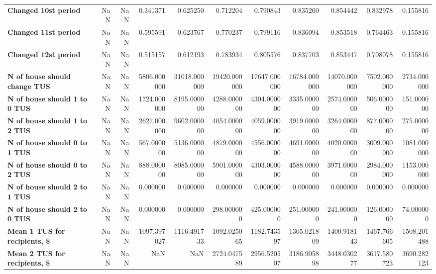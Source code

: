 \begin{longtable}{lrrrrrrrrrr}
\textbf{Changed 10st period               } &   NaN &   NaN &     0.341371 &      0.625250 &      0.712204 &      0.790843 &      0.835260 &      0.854442 &     0.832978 &     0.155816 \\
\textbf{Changed 11st period               } &   NaN &   NaN &     0.595591 &      0.623767 &      0.770237 &      0.799116 &      0.836094 &      0.853518 &     0.764463 &     0.155816 \\
\textbf{Changed 12st period               } &   NaN &   NaN &     0.515157 &      0.612193 &      0.783934 &      0.805576 &      0.837703 &      0.853447 &     0.708078 &     0.155816 \\
\textbf{N of house should change TUS      } &   NaN &   NaN &  5806.000000 &  31018.000000 &  19420.000000 &  17647.000000 &  16784.000000 &  14070.000000 &  7502.000000 &  2734.000000 \\
\textbf{N of house should 1 to 0 TUS      } &   NaN &   NaN &  1724.000000 &   8195.000000 &   4288.000000 &   4304.000000 &   3335.000000 &   2574.000000 &   506.000000 &   151.000000 \\
\textbf{N of house should 1 to 2 TUS      } &   NaN &   NaN &  2627.000000 &   9602.000000 &   4054.000000 &   4059.000000 &   3919.000000 &   3264.000000 &   877.000000 &   275.000000 \\
\textbf{N of house should 0 to 1 TUS      } &   NaN &   NaN &   567.000000 &   5136.000000 &   4879.000000 &   4556.000000 &   4691.000000 &   4020.000000 &  3009.000000 &  1081.000000 \\
\textbf{N of house should 0 to 2 TUS      } &   NaN &   NaN &   888.000000 &   8085.000000 &   5901.000000 &   4303.000000 &   4588.000000 &   3971.000000 &  2984.000000 &  1153.000000 \\
\textbf{N of house should 2 to 1 TUS      } &   NaN &   NaN &     0.000000 &      0.000000 &      0.000000 &      0.000000 &      0.000000 &      0.000000 &     0.000000 &     0.000000 \\
\textbf{N of house should 2 to 0 TUS      } &   NaN &   NaN &     0.000000 &      0.000000 &    298.000000 &    425.000000 &    251.000000 &    241.000000 &   126.000000 &    74.000000 \\
\textbf{Mean 1 TUS for recipients, \$      } &   NaN &   NaN &  1097.397027 &   1116.491733 &   1092.025065 &   1182.743597 &   1305.021809 &   1400.918143 &  1467.766605 &  1508.201488 \\
\textbf{Mean 2 TUS for recipients, \$      } &   NaN &   NaN &          NaN &           NaN &   2724.047589 &   2956.520507 &   3186.905898 &   3448.030277 &  3617.580723 &  3690.282123 \\

\end{longtable}
